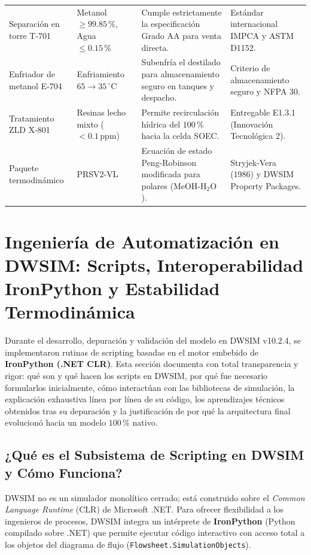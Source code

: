 \documentclass[11pt,a4paper]{article}
\begin{document}
\begin{longtable}{p{3.8cm} p{3.2cm} p{4.2cm} p{3.8cm}}
Separación en torre T-701 & Metanol $\ge 99.85\,\%$, Agua $\le 0.15\,\%$ & Cumple estrictamente la especificación Grado AA para venta directa. & Estándar internacional IMPCA y ASTM D1152. \\
Enfriador de metanol E-704 & Enfriamiento $65 \to 35\,^\circ\text{C}$ & Subenfría el destilado para almacenamiento seguro en tanques y despacho. & Criterio de almacenamiento seguro y NFPA 30. \\
Tratamiento ZLD X-801 & Resinas lecho mixto ($<0.1\,\text{ppm}$) & Permite recirculación hídrica del $100\,\%$ hacia la celda SOEC. & Entregable E1.3.1 (Innovación Tecnológica 2). \\
Paquete termodinámico & PRSV2-VL & Ecuación de estado Peng-Robinson modificada para polares ($\text{MeOH}$-$\text{H}_2\text{O}$). & Stryjek-Vera (1986) y DWSIM Property Packages. \\
\bottomrule
\end{longtable}

\section{Ingeniería de Automatización en DWSIM: Scripts, Interoperabilidad IronPython y Estabilidad Termodinámica}

Durante el desarrollo, depuración y validación del modelo en DWSIM v10.2.4, se implementaron rutinas de scripting basadas en el motor embebido de \textbf{IronPython (.NET CLR)}. Esta sección documenta con total transparencia y rigor: qué son y qué hacen los scripts en DWSIM, por qué fue necesario formularlos inicialmente, cómo interactúan con las bibliotecas de simulación, la explicación exhaustiva línea por línea de su código, los aprendizajes técnicos obtenidos tras su depuración y la justificación de por qué la arquitectura final evolucionó hacia un modelo $100\,\%$ nativo.

\subsection{¿Qué es el Subsistema de Scripting en DWSIM y Cómo Funciona?}
DWSIM no es un simulador monolítico cerrado; está construido sobre el \textit{Common Language Runtime} (CLR) de Microsoft .NET. Para ofrecer flexibilidad a los ingenieros de procesos, DWSIM integra un intérprete de \textbf{IronPython} (Python compilado sobre .NET) que permite ejecutar código interactivo con acceso total a los objetos del diagrama de flujo (\texttt{Flowsheet.SimulationObjects}).
\end{document}
